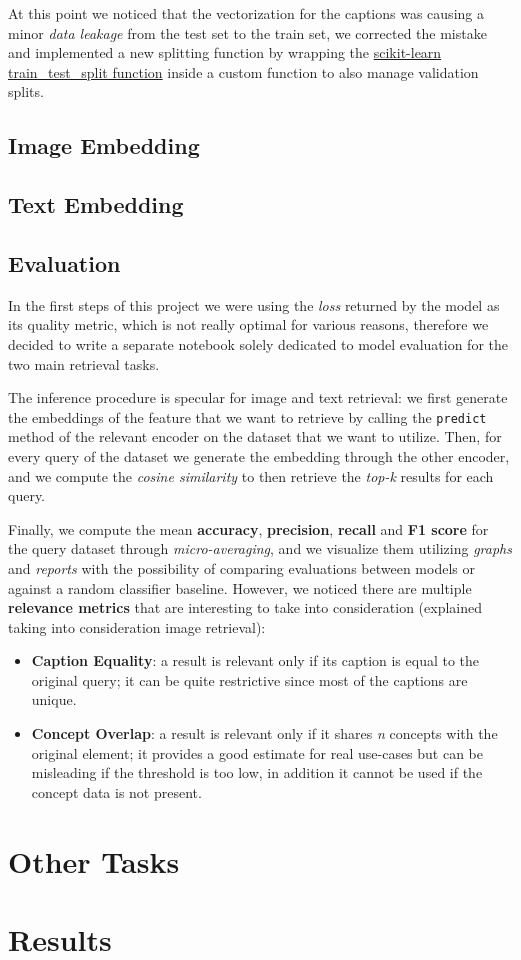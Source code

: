 \documentclass[12pt, a4paper]{article}
\begin{document}
At this point we noticed that the vectorization for the captions was causing a minor \textit{data leakage} from the test set to the train set, we corrected the mistake and implemented a new splitting function by wrapping the \href{https://scikit-learn.org/stable/modules/generated/sklearn.model_selection.train_test_split.html}{scikit-learn train\_test\_split function} inside a custom function to also manage validation splits.

\subsection{Image Embedding}
\blindtext[1]

\subsection{Text Embedding}
\blindtext[1]

\subsection{Evaluation}
In the first steps of this project we were using the \textit{loss} returned by the model as its quality metric, which is not really optimal for various reasons, therefore we decided to write a separate notebook solely dedicated to model evaluation for the two main retrieval tasks.

The inference procedure is specular for image and text retrieval: we first generate the embeddings of the feature that we want to retrieve by calling the \texttt{predict} method of the relevant encoder on the dataset that we want to utilize.
Then, for every query of the dataset we generate the embedding through the other encoder, and we compute the \textit{cosine similarity} to then retrieve the \textit{top-k} results for each query.

Finally, we compute the mean \textbf{accuracy}, \textbf{precision}, \textbf{recall} and \textbf{F1 score} for the query dataset through \textit{micro-averaging}, and we visualize them utilizing \textit{graphs} and \textit{reports} with the possibility of comparing evaluations between models or against a random classifier baseline.
However, we noticed there are multiple \textbf{relevance metrics} that are interesting to take into consideration (explained taking into consideration image retrieval):
\begin{itemize}
    \item \textbf{Caption Equality}: a result is relevant only if its caption is equal to the original query; it can be quite restrictive since most of the captions are unique.
    \item \textbf{Concept Overlap}: a result is relevant only if it shares \textit{n} concepts with the original element; it provides a good estimate for real use-cases but can be misleading if the threshold is too low, in addition it cannot be used if the concept data is not present.
\end{itemize}

\section{Other Tasks}

\section{Results}
\blindtext[1]
\end{document}
